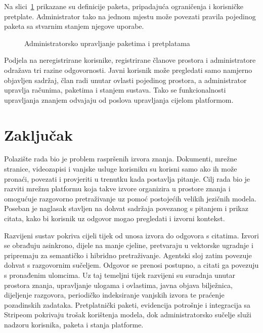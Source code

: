 Na slici~\ref{fig:administracija-pretplata} prikazane su definicije paketa, pripadajuća ograničenja i korisničke pretplate. Administrator tako na jednom mjestu može povezati pravila pojedinog paketa sa stvarnim stanjem njegove uporabe.

\begin{figure}[H]
    \centering
    \caption{Administratorsko upravljanje paketima i pretplatama}
    \label{fig:administracija-pretplata}
\end{figure}

Podjela na neregistrirane korisnike, registrirane članove prostora i administratore odražava tri razine odgovornosti. Javni korisnik može pregledati samo namjerno objavljen sadržaj, član radi unutar ovlasti pojedinog prostora, a administrator upravlja računima, paketima i stanjem sustava. Tako se funkcionalnosti upravljanja znanjem odvajaju od poslova upravljanja cijelom platformom.

\chapter{Zaključak}

Polazište rada bio je problem raspršenih izvora znanja. Dokumenti, mrežne stranice, videozapisi i vanjske usluge korisniku su korisni samo ako ih može pronaći, povezati i provjeriti u trenutku kada postavlja pitanje. Cilj rada bio je razviti mrežnu platformu koja takve izvore organizira u prostore znanja i omogućuje razgovorno pretraživanje uz pomoć postojećih velikih jezičnih modela. Poseban je naglasak stavljen na dohvat sadržaja povezanog s pitanjem i prikaz citata, kako bi korisnik uz odgovor mogao pregledati i izvorni kontekst.

Razvijeni sustav pokriva cijeli tijek od unosa izvora do odgovora s citatima. Izvori se obrađuju asinkrono, dijele na manje cjeline, pretvaraju u vektorske ugradnje i pripremaju za semantičko i hibridno pretraživanje. Agentski sloj zatim povezuje dohvat s razgovornim sučeljem. Odgovor se prenosi postupno, a citati ga povezuju s pronađenim ulomcima. Uz taj temeljni tijek razvijeni su suradnja unutar prostora znanja, upravljanje ulogama i ovlastima, javna objava bilježnica, dijeljenje razgovora, periodičko indeksiranje vanjskih izvora te praćenje pozadinskih zadataka. Pretplatnički paketi, evidencija potrošnje i integracija sa Stripeom pokrivaju trošak korištenja modela, dok administratorsko sučelje služi nadzoru korisnika, paketa i stanja platforme.

